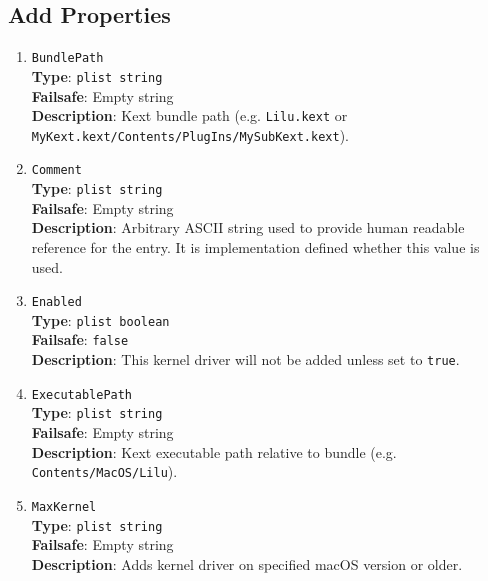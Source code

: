 \documentclass[]{article}
\makeatletter
\renewcommand{\label}[1]{%
\zref@wrapper@immediate{\oldlabel{#1}}}  %
\makeatother
\begin{document}
\subsection{Add Properties}\label{kernelpropsadd}

\begin{enumerate}
\item
  \texttt{BundlePath}\\
  \textbf{Type}: \texttt{plist\ string}\\
  \textbf{Failsafe}: Empty string\\
  \textbf{Description}: Kext bundle path (e.g. \texttt{Lilu.kext}
  or \texttt{MyKext.kext/Contents/PlugIns/MySubKext.kext}).

\item
  \texttt{Comment}\\
  \textbf{Type}: \texttt{plist\ string}\\
  \textbf{Failsafe}: Empty string\\
  \textbf{Description}: Arbitrary ASCII string used to provide human readable
  reference for the entry. It is implementation defined whether this value is
  used.

\item
  \texttt{Enabled}\\
  \textbf{Type}: \texttt{plist\ boolean}\\
  \textbf{Failsafe}: \texttt{false}\\
  \textbf{Description}: This kernel driver will not be added unless set to
  \texttt{true}.

\item
  \texttt{ExecutablePath}\\
  \textbf{Type}: \texttt{plist\ string}\\
  \textbf{Failsafe}: Empty string\\
  \textbf{Description}: Kext executable path relative to bundle
  (e.g. \texttt{Contents/MacOS/Lilu}).

\item
  \texttt{MaxKernel}\\
  \textbf{Type}: \texttt{plist\ string}\\
  \textbf{Failsafe}: Empty string\\
  \textbf{Description}: Adds kernel driver on specified macOS version or older.


\end{enumerate}
\end{document}

